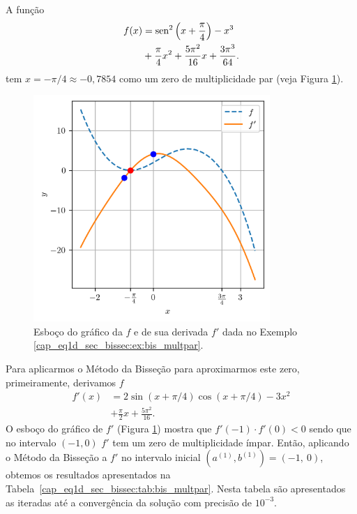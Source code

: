 \begin{ex}\label{cap_eq1d_sec_bissec:ex:bis_multpar}
  A função
  \begin{equation}
    \begin{aligned}
      f(x) &= \operatorname{sen}^2\left(x+\frac{\pi}{4}\right) - x^3 \\
           &+ \frac{\pi}{4}x^2 + \frac{5\pi^2}{16}x + \frac{3\pi^3}{64}.
    \end{aligned}
\end{equation}
tem $x=-\pi/4\approx -0,7854$ como um zero de multiplicidade par (veja Figura \ref{cap_eq1d_sec_bissec:fig:bis_multpar}).

\begin{figure}[H]
  \centering
  \includegraphics[width=0.8\textwidth]{./cap_eq1d/dados/fig_bis_multpar/fig}
  \caption{Esboço do gráfico da $f$ e de sua derivada $f'$ dada no Exemplo \ref{cap_eq1d_sec_bissec:ex:bis_multpar}.}
  \label{cap_eq1d_sec_bissec:fig:bis_multpar}
\end{figure}

Para aplicarmos o Método da Bisseção para aproximarmos este zero, primeiramente, derivamos $f$
\begin{equation}
  \begin{aligned}
    f'(x) &= 2\sin(x+\pi/4)\cos(x+\pi/4) - 3x^2 \\
          &+ \frac{\pi}{2}x + \frac{5\pi^2}{16}.
  \end{aligned}
\end{equation}
O esboço do gráfico de $f'$ (Figura \ref{cap_eq1d_sec_bissec:fig:bis_multpar}) mostra que $f'(-1)\cdot f'(0) < 0$ sendo que no intervalo $(-1, 0)$ $f'$ tem um zero de multiplicidade ímpar. Então, aplicando o Método da Bisseção a $f'$ no intervalo inicial $(a^{(1)}, b^{(1)}) = (-1, ~0)$, obtemos os resultados apresentados na Tabela~\ref{cap_eq1d_sec_bissec:tab:bis_multpar}. Nesta tabela são apresentados as iteradas até a convergência da solução com precisão de $10^{-3}$.


\end{ex}
